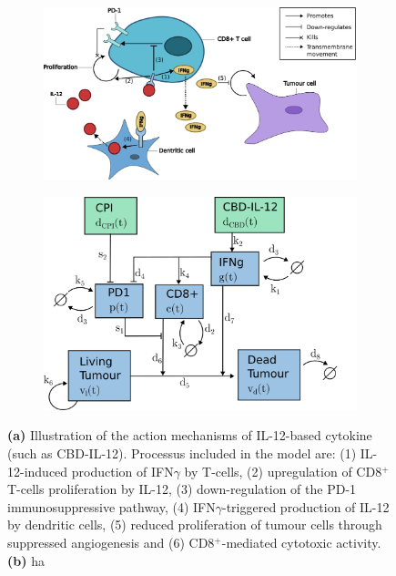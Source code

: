 \documentclass[11pt]{article}
\begin{document}
\begin{figure}
    \centering
    \begin{subfigure}{.49\textwidth}
        \centering\includegraphics[scale=0.3]{immune_resp.png}
        \caption{}        
    \end{subfigure}
    \begin{subfigure}{.49\textwidth}
        \centering\includegraphics[scale=0.3]{control_process.png}    
        \caption{}
    \end{subfigure}
    \caption{\textbf{(a)} Illustration of the action mechanisms of IL-12-based cytokine (such as CBD-IL-12). Processus included in the model are: (1) IL-12-induced production of IFN$\gamma$ by T-cells, (2) upregulation of CD8$^+$ T-cells proliferation by IL-12, (3) down-regulation of the PD-1 immunosuppressive pathway, (4) IFN$\gamma$-triggered production of IL-12 by dendritic cells, (5) reduced proliferation of tumour cells through suppressed angiogenesis and (6) CD8$^+$-mediated cytotoxic activity.\\
    \textbf{(b)} ha}
    \label{fig:mech}
\end{figure}
\end{document}
